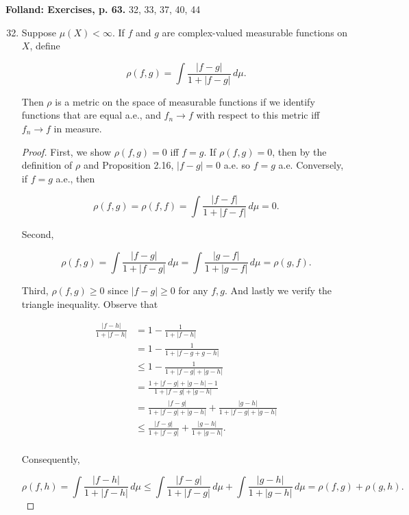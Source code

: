 \documentclass[11pt,oneside,english]{amsart}
\theoremstyle{definition}
\begin{document}
\rightline{\today}

\vspace{-5mm}
\textbf{Folland: Exercises, p. 63.} 32, 33, 37, 40, 44



\vspace{5mm}
\begin{enumerate}
\setcounter{enumi}{31}



\item Suppose $\mu(X)<\infty$. If $f$ and $g$ are complex-valued measurable functions on $X$, define

\[
\rho(f,g)=\int\frac{|f-g|}{1+|f-g|}\,d\mu.
\]

Then $\rho$ is a metric on the space of measurable functions if we identify functions that are equal a.e., and $f_n\rightarrow f$ with respect to this metric iff $f_n\rightarrow f$ in measure.

\begin{proof}
First, we show $\rho(f,g)=0$ iff $f=g$. If $\rho(f,g)=0$, then by the definition of $\rho$ and Proposition 2.16, $|f-g|=0$ a.e. so $f=g$ a.e. Conversely, if $f=g$ a.e., then 

\[
\rho(f,g)=\rho(f,f)=\int\frac{|f-f|}{1+|f-f|}\,d\mu=0. 
\]

Second, 

\[
\rho(f,g)=\int\frac{|f-g|}{1+|f-g|}\,d\mu=\int\frac{|g-f|}{1+|g-f|}\,d\mu=\rho(g,f).
\]

Third, $\rho(f,g)\geq0$ since $|f-g|\geq0$ for any $f,g$. And lastly we verify the triangle inequality. Observe that

\begin{align*}
\frac{|f-h|}{1+|f-h|}&=1-\frac{1}{1+|f-h|}\\[2mm]
&=1-\frac{1}{1+|f-g+g-h|}\\[2mm]
&\leq1-\frac{1}{1+|f-g|+|g-h|}\\[2mm]
&=\frac{1+|f-g|+|g-h|-1}{1+|f-g|+|g-h|}\\[2mm]
&=\frac{|f-g|}{1+|f-g|+|g-h|}+\frac{|g-h|}{1+|f-g|+|g-h|}\\[2mm]
&\leq\frac{|f-g|}{1+|f-g|}+\frac{|g-h|}{1+|g-h|}.\\[2mm]
\end{align*}

Consequently,

\[
\rho(f,h)=\int\frac{|f-h|}{1+|f-h|}\,d\mu\leq\int\frac{|f-g|}{1+|f-g|}\,d\mu +\int\frac{|g-h|}{1+|g-h|}\,d\mu=\rho(f,g)+\rho(g,h).
\]


\end{proof}
\end{enumerate}
\end{document}

